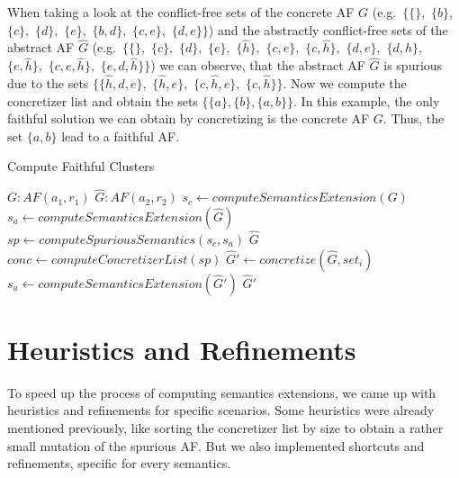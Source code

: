 When taking a look at the conflict-free sets of the concrete AF $G$ (e.g.\ $\bigl\{ \{\},$ $\{b\},$ $\{c\},$ $\{d\},$ $\{e\},$ $\{b, d\},$  $\{c, e\},$ $\{d, e\} \bigl\}$) and the abstractly conflict-free sets of the abstract AF $\hat{G}$ (e.g.\ $\bigl\{ \{\},$ $\{c\},$ $\{d\},$ $\{e\},$ $\{\hat{h}\},$ $\{c, e\},$ $\{c, \hat{h}\},$ $\{d, e\},$ $\{d, \hat{h}\},$ $\{e, \hat{h}\},$ $\{c, e, \hat{h}\},$ $\{e, d, \hat{h}\} \bigl\}$) we can observe, that the abstract AF $\hat{G}$ is spurious due to the sets $\bigl\{\{\hat{h}, d, e\},$ $\{\hat{h}, e\},$ $\{c, \hat{h}, e\},$ $\{c, \hat{h}\}\bigl\}$. Now we compute the concretizer list and obtain the sets $\bigl\{ \{a\}, \{b\}, \{a, b\}\bigl\}$. In this example, the only faithful solution we can obtain by concretizing is the concrete AF $G$. Thus, the set $\{a, b\}$ lead to a faithful AF.
\vspace{0.5cm}

\begin{algorithm}
    \caption{Compute Faithful Clusters}\label{alg:computeFaithfulClusters}
    \begin{algorithmic}[1]
        \Require $G: AF(a_1, r_1)$ 
        \Require $\hat{G}: AF(a_2, r_2)$ 
        \State $s_c \gets computeSemanticsExtension(G)$
        \State $s_a \gets computeSemanticsExtension(\hat{G})$
        \State $sp \gets computeSpuriousSemantics(s_c, s_a)$
            \State \Return $\hat{G}$
        \EndIf
        \State $conc \gets computeConcretizerList(sp)$
            \State $\hat{G}' \gets concretize(\hat{G}, set_i)$
            \State $s_a \gets computeSemanticsExtension(\hat{G}')$
                \State \Return $\hat{G}'$
            \EndIf
        \EndFor
    \end{algorithmic}
\end{algorithm}



\newpage
\section{Heuristics and Refinements}
\label{sec:HeuristicsAndRefinements}

To speed up the process of computing semantics extensions, we came up with heuristics and refinements for specific scenarios. Some heuristics were already mentioned previously, like sorting the concretizer list by size to obtain a rather small mutation of the spurious AF. But we also implemented shortcuts and refinements, specific for every semantics.

